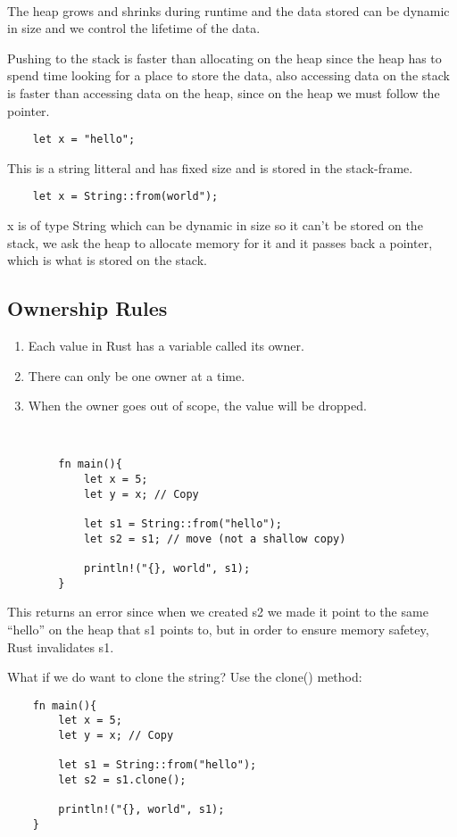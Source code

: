 \

The heap grows and shrinks during runtime and the data stored can be dynamic in size and we control the lifetime of the data.

Pushing to the stack is faster than allocating on the heap since the heap has to spend time looking for a place to store the data, also accessing data on the stack is faster 
than accessing data on the heap, since on the heap we must follow the pointer.

\begin{lstlisting}
    let x = "hello";
\end{lstlisting}
This is a string litteral and has fixed size and is stored in the stack-frame.

\begin{lstlisting}
    let x = String::from(world");
\end{lstlisting}
x is of type String which can be dynamic in size so it can't be stored on the stack, we ask the heap to allocate memory for it 
and it passes back a pointer, which is what is stored on the stack. 

\subsection{Ownership Rules}

\begin{enumerate}
    \item Each value in Rust has a variable called its owner.
    \item There can only be one owner at a time.
    \item When the owner goes out of scope, the value will be dropped.
\end{enumerate}

\begin{example}

    \

    \begin{lstlisting}
        fn main(){
            let x = 5;
            let y = x; // Copy

            let s1 = String::from("hello");
            let s2 = s1; // move (not a shallow copy)

            println!("{}, world", s1);
        }
    \end{lstlisting}
This returns an error since when we created s2 we made it point to the same ``hello'' on the heap that s1 points to, but in order to 
ensure memory safetey, Rust invalidates s1. 

What if we do want to clone the string? Use the clone() method: \begin{lstlisting}
    fn main(){
        let x = 5;
        let y = x; // Copy

        let s1 = String::from("hello");
        let s2 = s1.clone();

        println!("{}, world", s1);
    }
\end{lstlisting}
\end{example}

